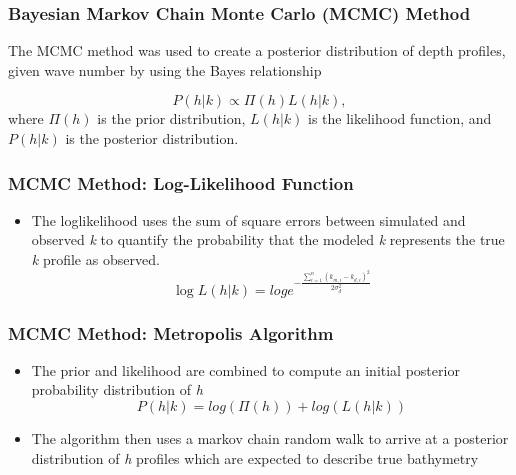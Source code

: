 \documentclass[7pt]{beamer}
\begin{document}
 \begin{frame}
\frametitle{Bayesian Markov Chain Monte Carlo (MCMC) Method}
The MCMC method was used to create a posterior distribution of depth profiles, given wave number by using the Bayes relationship

\begin{equation}\label{bayes}
P(h|%
k) \propto \Pi(h)L(h|%
k),
\end{equation} 
where $\Pi(h)$ is the prior distribution, $L(h|%
k)$ is the likelihood function, and $P(h|%
k)$ is the posterior distribution.
\end{frame}

\begin{frame}
 \frametitle{MCMC Method: Log-Likelihood Function}
\begin{itemize}
\item The loglikelihood uses the sum of square errors between simulated and observed \textit{k} to quantify the probability that the modeled \textit{k} represents the true \textit{k} profile as observed.
\begin{equation} \label{likely}
\log{L(h|%
k)}=log{e^{- \frac{\sum\limits_{i=1}^n({k}_{m,i}-k_{d,i})^2}{2\sigma_{d}^2}}}
\end{equation} 

\end{itemize}
\end{frame}

\begin{frame}
 \frametitle{MCMC Method: Metropolis Algorithm}
\begin{itemize}
\item The prior and likelihood are combined to compute an initial posterior probability distribution of \textit{h}\\
\begin{equation}\label{post}
P(h|%
k) = log(\Pi(h)) + log(L(h|%
k))
\end{equation}
\item The algorithm then uses a markov chain random walk to %
arrive at a posterior distribution of \textit{h} profiles which are expected to describe true bathymetry
\end{itemize}
\end{frame}
\end{document}
